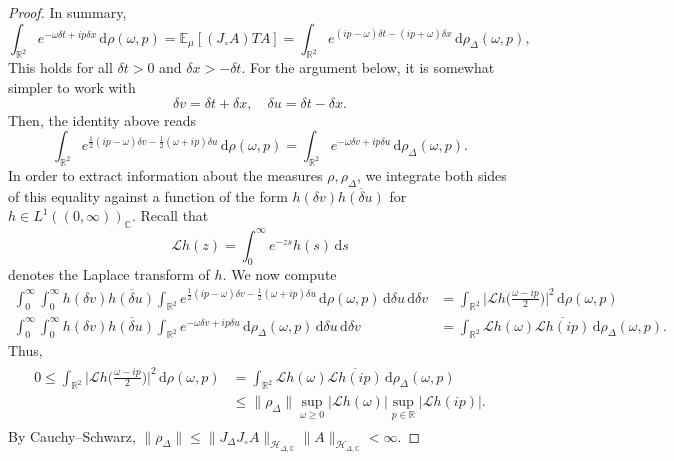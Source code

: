 \documentclass[11pt, letterpaper, reqno]{amsart}
\theoremstyle{definition}
\theoremstyle{remark}
\newcommand{\bbC}{\mathbb{C}}
\newcommand{\bbE}{\mathbb{E}}
\newcommand{\bbR}{\mathbb{R}}
\newcommand{\calH}{\mathcal{H}}
\newcommand{\calL}{\mathcal{L}}
\newcommand{\dd}{\,\mathrm{d}}
\begin{document}
\begin{proof}
    In summary, 
    \begin{equation}
        \int_{\bbR^2} e^{-\omega \delta t + i p \delta x} \dd \rho(\omega, p) = \bbE_\mu[(J_\circ A)T A ]=  \int_{\bbR^2} e^{(ip-\omega) \delta t - (ip+\omega) \delta x} \dd \rho_\Delta(\omega,p),
    \end{equation}
    This holds for all $\delta t>0$ and $\delta x>-\delta t$. 
    For the argument below, it is somewhat simpler to work with 
    \begin{equation}
        \delta v=\delta t +\delta x,\quad \delta u=\delta t-\delta x.
    \end{equation}
    Then, the identity above reads
    \begin{equation}
        \int_{\bbR^2} e^{\frac{1}{2}(ip-\omega)\delta v - \frac{1}{2} (\omega+ip)\delta u } \dd \rho(\omega, p) = \int_{\bbR^2} e^{-\omega \delta v +i p \delta u} \dd \rho_\Delta(\omega,p).
    \end{equation}
    In order to extract information about the measures $\rho,\rho_\Delta$,
    we integrate both sides of this equality against a function of the
    form $h(\delta v)\overline{h(\delta u)}$ for
    $h\in L^1((0,\infty))_\bbC$. Recall that 
    \begin{equation}
        \calL h(z) = \int_0^\infty e^{-zs} h(s) \dd s 
    \end{equation}
    denotes the Laplace transform of $h$. We now compute 
    \begin{align}
        \int_0^\infty \int_0^\infty h(\delta v) \overline{h(\delta u)} \int_{\bbR^2} e^{\frac{1}{2}(ip-\omega)\delta v - \frac{1}{2} (\omega+ip)\delta u } \dd \rho(\omega, p)  \dd \delta u \dd \delta v &= \int_{\bbR^2} \Big|\calL h\Big(\frac{\omega-ip}{2}\Big)\Big|^2  \dd \rho(\omega,p) \\ 
        \int_0^\infty \int_0^\infty  h(\delta v) \overline{h (\delta u)}\int_{\bbR^2} e^{-\omega \delta v +i p \delta u} \dd \rho_\Delta(\omega,p) \dd \delta u \dd \delta v &= \int_{\bbR^2} \calL h(\omega)\overline{\calL h(ip)} \dd \rho_\Delta(\omega,p) .
    \end{align}
    Thus, 
    \begin{align}\begin{split} 
        0 \leq \int_{\bbR^2} \Big|\calL h\Big(\frac{\omega-ip}{2}\Big)\Big|^2  \dd \rho(\omega,p) &= \int_{\bbR^2} \calL h(\omega)\overline{\calL h(ip)} \dd \rho_\Delta(\omega,p) \\
        &\leq \lVert \rho_\Delta \rVert \sup_{\omega\geq 0} |\calL h(\omega) |  \sup_{p\in \bbR} |\calL h(ip)|.
        \end{split} 
    \end{align}
    By Cauchy--Schwarz, $\lVert \rho_\Delta \rVert \leq \lVert J_\Delta J_\circ A\rVert_{\calH_{\Delta,\bbC}}\lVert A \rVert_{\calH_{\Delta,\bbC}}<\infty$. 


\end{proof}
\end{document}
